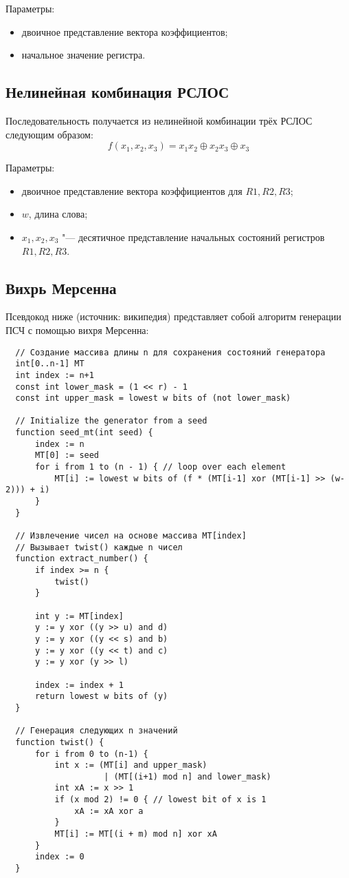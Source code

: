 \documentclass[bachelor, och, labwork]{SCWorks}
\begin{document}
Параметры:
\begin{itemize}
  \item двоичное представление вектора коэффициентов;
  \item начальное значение регистра.
\end{itemize}

\subsection{Нелинейная комбинация РСЛОС}
Последовательность получается из нелинейной комбинации трёх РСЛОС следующим образом:
\[ f(x_1, x_2, x_3) = x_1 x_2 \oplus x_2 x_3 \oplus x_3 \]

Параметры:
\begin{itemize}
  \item двоичное представление вектора коэффициентов для $R1, R2, R3$;
  \item $w$, длина слова;
  \item $x_1, x_2, x_3$ "--- десятичное представление начальных состояний регистров $R1, R2, R3$.
\end{itemize}

\subsection{Вихрь Мерсенна}
Псевдокод ниже (источник: википедия) представляет собой алгоритм генерации ПСЧ с
помощью вихря Мерсенна:
\begin{verbatim}
  // Создание массива длины n для сохранения состояний генератора
  int[0..n-1] MT
  int index := n+1
  const int lower_mask = (1 << r) - 1
  const int upper_mask = lowest w bits of (not lower_mask)
  
  // Initialize the generator from a seed
  function seed_mt(int seed) {
      index := n
      MT[0] := seed
      for i from 1 to (n - 1) { // loop over each element
          MT[i] := lowest w bits of (f * (MT[i-1] xor (MT[i-1] >> (w-2))) + i)
      }
  }
  
  // Извлечение чисел на основе массива MT[index]
  // Вызывает twist() каждые n чисел
  function extract_number() {
      if index >= n {
          twist()
      }
  
      int y := MT[index]
      y := y xor ((y >> u) and d)
      y := y xor ((y << s) and b)
      y := y xor ((y << t) and c)
      y := y xor (y >> l)
  
      index := index + 1
      return lowest w bits of (y)
  }
  
  // Генерация следующих n значений
  function twist() {
      for i from 0 to (n-1) {
          int x := (MT[i] and upper_mask)
                    | (MT[(i+1) mod n] and lower_mask)
          int xA := x >> 1
          if (x mod 2) != 0 { // lowest bit of x is 1
              xA := xA xor a
          }
          MT[i] := MT[(i + m) mod n] xor xA
      }
      index := 0
  }  
\end{verbatim}
\end{document}
